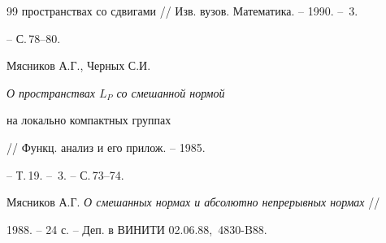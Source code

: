 \begin{thebibliography}{99}
{пространствах со сдвигами} // Изв. вузов. Математика. -- 1990. -- \No\,3.


-- С.\,78--80.




Мясников А.Г., Черных С.И. {\em О пространствах $L_P$ со смешанной нормой


на локально компактных группах} // Функц. анализ и его прилож. -- 1985.


-- Т.\,19. -- \No\,3. -- С.\,73--74.




Мясников А.Г. {\em О смешанных нормах и абсолютно непрерывных нормах} //


1988. -- 24 с. -- Деп. в ВИНИТИ 02.06.88, \No\,4830-B88.








\end{thebibliography}





\vskip 2cm















